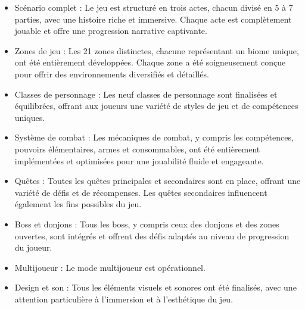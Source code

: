 \begin{itemize}

    \item Scénario complet : Le jeu est structuré en trois actes, chacun divisé en 5 à 7 parties, avec une histoire riche et immersive. Chaque acte est complètement jouable et offre une progression narrative captivante.
    \\

    \item Zones de jeu : Les 21 zones distinctes, chacune représentant un biome unique, ont été entièrement développées. Chaque zone a été soigneusement conçue pour offrir des environnements diversifiés et détaillés.
    \\

    \item Classes de personnage : Les neuf classes de personnage sont finalisées et équilibrées, offrant aux joueurs une variété de styles de jeu et de compétences uniques.
    \\

    \item Système de combat : Les mécaniques de combat, y compris les compétences, pouvoirs élémentaires, armes et consommables, ont été entièrement implémentées et optimisées pour une jouabilité fluide et   engageante.
    \\

    \item Quêtes : Toutes les quêtes principales et secondaires sont en place, offrant une variété de défis et de récompenses. Les quêtes secondaires influencent également les fins possibles du jeu.
    \\

    \item Boss et donjons : Tous les boss, y compris ceux des donjons et des zones ouvertes, sont intégrés et offrent des défis adaptés au niveau de progression du joueur.
    \\

    \item Multijoueur : Le mode multijoueur est opérationnel.
    \\

    \item Design et son : Tous les éléments visuels et sonores ont été finalisés, avec une attention particulière à l'immersion et à l'esthétique du jeu.
    \\

\end{itemize}

